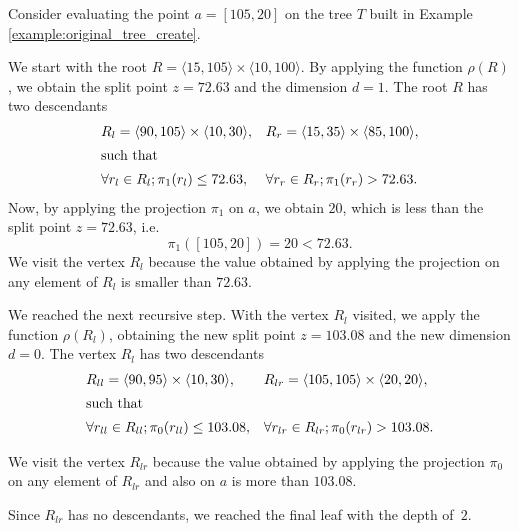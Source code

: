 \begin{example}
\label{ex:regular_point_evaluation_original}
    Consider evaluating the point $a = [105,20]$ on the tree $T$ built in Example \ref{example:original_tree_create}.

    We start with the root $R = \langle 15,105\rangle \times \langle 10, 100 \rangle$.
    By applying the function $\rho(R)$, we obtain the split point $z = 72.63$ and the dimension $d = 1$.
    The root $R$ has two descendants 
\begin{align*}
    &R_l = \langle 90,105\rangle \times \langle 10, 30 \rangle,&
    &R_r = \langle 15,35\rangle \times \langle 85, 100 \rangle,\\
    \intertext{such that}
    &\forall r_l\in R_l; \pi_1(r_l) \le 72.63,&
    &\forall r_r\in R_r; \pi_1(r_r) > 72.63.
\end{align*}
Now, by applying the projection $\pi_1$ on $a$, we obtain $20$, which is less than the split point $z = 72.63$, i.e.
$$\pi_1([105,20]) = 20 < 72.63.$$
We visit the vertex $R_l$ because the value obtained by applying the projection on any element of $R_l$ is smaller than $72.63$.

We reached the next recursive step. With the vertex $R_l$ visited, we apply the function $\rho(R_l)$, obtaining the new split point $z = 103.08$ and the new dimension $d = 0$.
The vertex $R_l$ has two descendants 
\begin{align*}
    &R_{ll} = \langle 90,95\rangle \times \langle 10, 30 \rangle,&
    &R_{lr} = \langle 105,105\rangle \times \langle 20,20 \rangle,\\
    \intertext{such that}
    &\forall r_{ll}\in R_{ll}; \pi_0(r_{ll}) \le 103.08,&
    &\forall r_{lr}\in R_{lr}; \pi_0(r_{lr}) > 103.08.
\end{align*}

We visit the vertex $R_{lr}$ because the value obtained by applying the projection $\pi_0$ on any element of $R_{lr}$ and also on $a$ is more than $103.08$.

Since $R_{lr}$ has no descendants, we reached the final leaf with the depth of~$2$.
\end{example}


